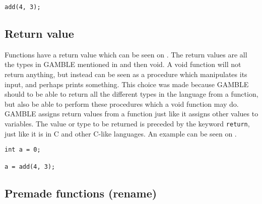 \begin{lstlisting}[caption={Function Call},label={lst:functionCall}]
add(4, 3);
\end{lstlisting}


\subsection{Return value}
Functions have a return value which can be seen on .
The return values are all the types in GAMBLE mentioned in  and then void. 
A void function will not return anything, but instead can be seen as a procedure which manipulates its input, and perhaps prints something.
This choice was made because GAMBLE should to be able to return all the different types in the language from a function, but also be able to perform these procedures which a void function may do.
GAMBLE assigns return values from a function just like it assigns other values to variables.
The value or type to be returned is preceded by the keyword \texttt{return}, just like it is in C and other C-like languages.
An example can be seen on .

\begin{lstlisting}[caption={Return Function},label={lst:returnFunction}]
int a = 0;

a = add(4, 3);
\end{lstlisting}

\subsection{Premade functions (rename)} 

%



